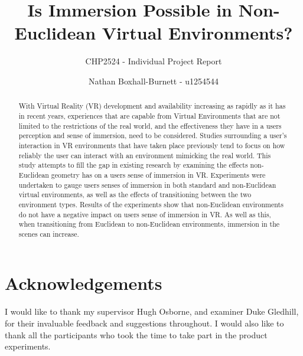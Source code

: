 \documentclass[abstract=on,12pt]{scrreprt}
\title{Is Immersion Possible in Non-Euclidean Virtual Environments?}
\subtitle{CHP2524 - Individual Project Report}
\author{Nathan Boxhall-Burnett - u1254544}
\begin{document}
	\maketitle


	\tableofcontents

	\begin{abstract}
		\thispagestyle{plain}

		With Virtual Reality (VR) development and availability increasing as rapidly as it has in recent years, experiences that are capable from Virtual Environments that are not limited to the restrictions of the real world, and the effectiveness they have in a users perception and sense of immersion, need to be considered.
		Studies surrounding a user's interaction in VR environments that have taken place previously tend to focus on how reliably the user can interact with an environment mimicking the real world.
		This study attempts to fill the gap in existing research by examining the effects non-Euclidean geometry has on a users sense of immersion in VR.
		Experiments were undertaken to gauge users senses of immersion in both standard and non-Euclidean virtual environments, as well as the effects of transitioning between the two environment types.
		Results of the experiments show that non-Euclidean environments do not have a negative impact on users sense of immersion in VR.
		As well as this, when transitioning from Euclidean to non-Euclidean environments, immersion in the scenes can increase.
	\end{abstract}

	\titleformat{\chapter}[hang]{\large\bfseries}{\thechapter}{1em}{\large}

	\setcounter{secnumdepth}{-2}

	\chapter{Acknowledgements}
		I would like to thank my supervisor Hugh Osborne, and examiner Duke Gledhill, for their invaluable feedback and suggestions throughout.
		I would also like to thank all the participants who took the time to take part in the product experiments.
\end{document}

